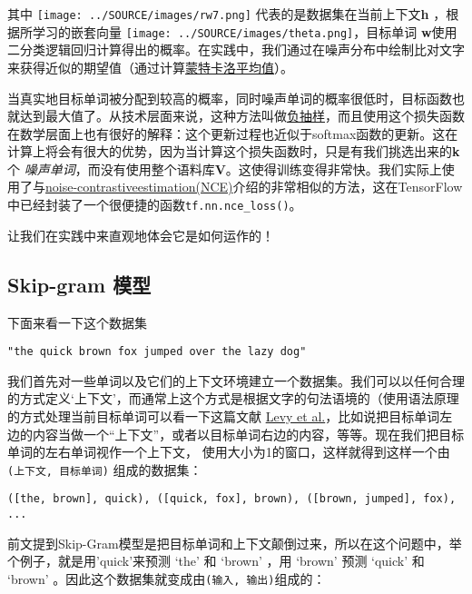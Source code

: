 其中 \texttt{[image: ../SOURCE/images/rw7.png]} 代表的是数据集在当前上下文\textbf{h} ，根据所学习的嵌套向量 \texttt{[image: ../SOURCE/images/theta.png]}，目标单词 \textbf{w}使用二分类逻辑回归计算得出的概率。在实践中，我们通过在噪声分布中绘制比对文字来获得近似的期望值（通过计算\href{https://en.wikipedia.org/wiki/Monte_Carlo_integration}{蒙特卡洛平均值}）。

当真实地目标单词被分配到较高的概率，同时噪声单词的概率很低时，目标函数也就达到最大值了。从技术层面来说，这种方法叫做\href{http://papers.nips.cc/paper/5021-distributed-representations-of-words-and-phrases-and-their-compositionality.pdf}{负抽样}，而且使用这个损失函数在数学层面上也有很好的解释：这个更新过程也近似于softmax函数的更新。这在计算上将会有很大的优势，因为当计算这个损失函数时，只是有我们挑选出来的\textbf{k} 个 \emph{噪声单词}，而没有使用整个语料库\textbf{V}。这使得训练变得非常快。我们实际上使用了与\href{http://papers.nips.cc/paper/5165-learning-word-embeddings-efficiently-with-noise-contrastive-estimation.pdf}{noise-contrastiveestimation(NCE)}介绍的非常相似的方法，这在TensorFlow中已经封装了一个很便捷的函数\lstinline{tf.nn.nce_loss()}。

让我们在实践中来直观地体会它是如何运作的！

\subsection{Skip-gram 模型}\label{skip-gram_model}

下面来看一下这个数据集

\lstinline{"the quick brown fox jumped over the lazy dog"}

我们首先对一些单词以及它们的上下文环境建立一个数据集。我们可以以任何合理的方式定义`上下文'，而通常上这个方式是根据文字的句法语境的（使用语法原理的方式处理当前目标单词可以看一下这篇文献
\href{https://levyomer.files.wordpress.com/2014/04/dependency-based-word-embeddings-acl-2014.pdf}{Levy et al.}，比如说把目标单词左边的内容当做一个“上下文”，或者以目标单词右边的内容，等等。现在我们把目标单词的左右单词视作一个上下文，
使用大小为1的窗口，这样就得到这样一个由\texttt{(上下文,\ 目标单词)}
组成的数据集：

\texttt{({[}the,\ brown{]},\ quick),\ ({[}quick,\ fox{]},\ brown),\ ({[}brown,\ jumped{]},\ fox),\ ...}

前文提到Skip-Gram模型是把目标单词和上下文颠倒过来，所以在这个问题中，举个例子，就是用'quick'来预测
`the' 和 `brown' ，用 `brown' 预测 `quick' 和 `brown'
。因此这个数据集就变成由\texttt{(输入,\ 输出)}组成的：

